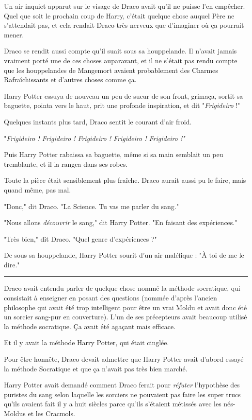 Un air inquiet apparut sur le visage de Draco avait qu'il ne puisse l'en empêcher. Quel que soit le prochain coup de Harry, c'était quelque chose auquel Père ne s'attendait pas, et cela rendait Draco très nerveux que d'imaginer où ça pourrait mener.

Draco se rendit aussi compte qu'il suait sous sa houppelande. Il n'avait jamais vraiment porté une de ces choses auparavant, et il ne s'était pas rendu compte que les houppelandes de Mangemort avaient probablement des Charmes Rafraîchissants et d'autres choses comme ça.

Harry Potter essuya de nouveau un peu de sueur de son front, grimaça, sortit sa baguette, pointa vers le haut, prit une profonde inspiration, et dit "\emph{Frigideiro}  !"

Quelques instants plus tard, Draco sentit le courant d'air froid.

"\emph{Frigideiro ! Frigideiro ! Frigideiro ! Frigideiro ! Frigideiro !"} 

Puis Harry Potter rabaissa sa baguette, même si sa main semblait un peu tremblante, et il la rangea dans ses robes.

Toute la pièce était sensiblement plus fraîche. Draco aurait aussi pu le faire, mais quand même, pas mal.

"Donc," dit Draco. "La Science. Tu vas me parler du sang."

"Nous allons \emph{découvrir}  le sang," dit Harry Potter. "En faisant des expériences."

"Très bien," dit Draco. "Quel genre d'expériences ?"

De sous sa houppelande, Harry Potter sourit d'un air maléfique : "À toi de me le dire."
\par\noindent\rule{\textwidth}{0.4pt}
Draco avait entendu parler de quelque chose nommé la méthode socratique, qui consistait à enseigner en posant des questions (nommée d'après l'ancien philosophe qui avait été trop intelligent pour être un vrai Moldu et avait donc été un sorcier sang-pur en couverture). L'un de ses précepteurs avait beaucoup utilisé la méthode socratique. Ça avait été agaçant mais efficace.

Et il y avait la méthode Harry Potter, qui était cinglée.

Pour être honnête, Draco devait admettre que Harry Potter avait d'abord essayé la méthode Socratique et que ça n'avait pas très bien marché.

Harry Potter avait demandé comment Draco ferait pour \emph{réfuter}  l'hypothèse des puristes du sang selon laquelle les sorciers ne pouvaient pas faire les super trucs qu'ils avaient fait il y a huit siècles parce qu'ils s'étaient métissés avec les nés-Moldus et les Cracmols.

